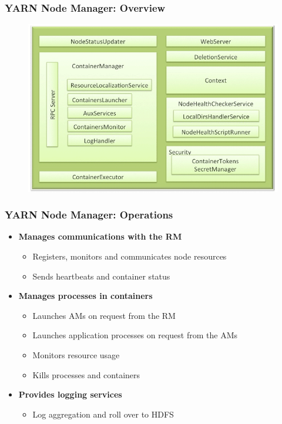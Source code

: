 \begin{frame}
\frametitle{YARN Node Manager: Overview}
  \begin{figure}[h]
    \centering
    \includegraphics[scale=0.4]{./figures/yarn_NM}
    \label{fig:yarn_NM}
  \end{figure}
\end{frame}

\begin{frame}
\frametitle{YARN Node Manager: Operations}
\begin{itemize}
  \item {\bf Manages communications with the RM}
  \begin{itemize}
    \item Registers, monitors and communicates node resources
    \item Sends heartbeats and container status
  \end{itemize}

\vspace{20pt}

  \item {\bf Manages processes in containers}
  \begin{itemize}
    \item Launches AMs on request from the RM
    \item Launches application processes on request from the AMs
    \item Monitors resource usage
    \item Kills processes and containers
  \end{itemize}

\vspace{20pt}

  \item {\bf Provides logging services}
  \begin{itemize}
    \item Log aggregation and roll over to HDFS
  \end{itemize}
\end{itemize}
\end{frame}

